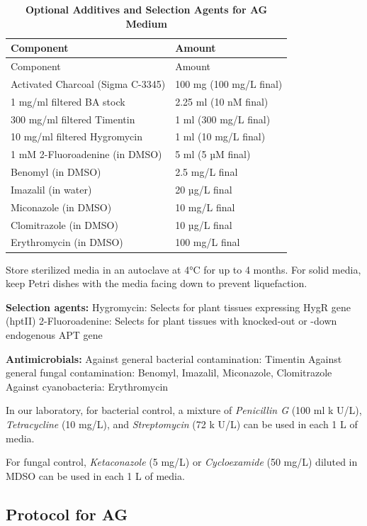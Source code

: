 \documentclass[
  11pt,
]{article}
\begin{document}
\begin{longtable}[]{@{}ll@{}}
\caption{\textbf{Optional Additives and Selection Agents for AG
Medium}}\tabularnewline
\toprule\noalign{}
Component & Amount \\
\midrule\noalign{}
\endfirsthead
\toprule\noalign{}
Component & Amount \\
\midrule\noalign{}
\endhead
\bottomrule\noalign{}
\endlastfoot
Activated Charcoal (Sigma C-3345) & 100 mg (100 mg/L final) \\
1 mg/ml filtered BA stock & 2.25 ml (10 nM final) \\
300 mg/ml filtered Timentin & 1 ml (300 mg/L final) \\
10 mg/ml filtered Hygromycin & 1 ml (10 mg/L final) \\
1 mM 2-Fluoroadenine (in DMSO) & 5 ml (5 µM final) \\
Benomyl (in DMSO) & 2.5 mg/L final \\
Imazalil (in water) & 20 µg/L final \\
Miconazole (in DMSO) & 10 mg/L final \\
Clomitrazole (in DMSO) & 10 µg/L final \\
Erythromycin (in DMSO) & 100 mg/L final \\
\end{longtable}

Store sterilized media in an autoclave at 4°C for up to 4 months. For
solid media, keep Petri dishes with the media facing down to prevent
liquefaction.

\textbf{Selection agents:} Hygromycin: Selects for plant tissues
expressing HygR gene (hptII) 2-Fluoroadenine: Selects for plant tissues
with knocked-out or -down endogenous APT gene

\textbf{Antimicrobials:} Against general bacterial contamination:
Timentin Against general fungal contamination: Benomyl, Imazalil,
Miconazole, Clomitrazole Against cyanobacteria: Erythromycin

In our laboratory, for bacterial control, a mixture of \emph{Penicillin
G} (100 ml k U/L), \emph{Tetracycline} (10 mg/L), and
\emph{Streptomycin} (72 k U/L) can be used in each 1 L of media.

For fungal control, \emph{Ketaconazole} (5 mg/L) or \emph{Cycloexamide}
(50 mg/L) diluted in MDSO can be used in each 1 L of media.

\subsection{Protocol for AG}\label{protocol-for-ag}
\end{document}
